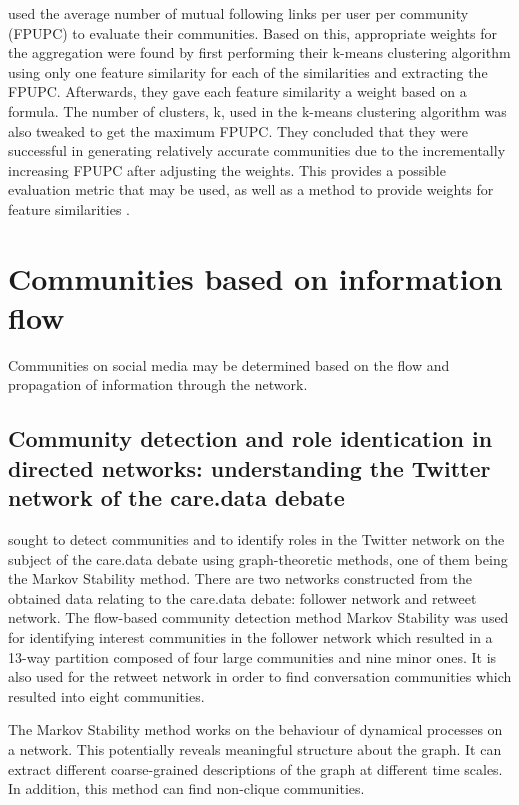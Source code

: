  used the average number of mutual following links per user per community (FPUPC) to evaluate their communities. Based on this, appropriate weights for the aggregation were found by first performing their k-means clustering algorithm using only one feature similarity for each of the similarities and extracting the FPUPC. Afterwards, they gave each feature similarity a weight based on a formula. The number of clusters, k, used in the k-means clustering algorithm was also tweaked to get the maximum FPUPC. They concluded that they were successful in generating relatively accurate communities due to the incrementally increasing FPUPC after adjusting the weights. This provides a possible evaluation metric that may be used, as well as a method to provide weights for feature similarities \cite{Zhang:2012}.


\section{Communities based on information flow}


Communities on social media may be determined based on the flow and propagation of information through the network.


\subsection{Community detection and role identication in directed networks: understanding the Twitter network of the care.data debate}


 sought to detect communities and to identify roles in the Twitter network on the subject of the care.data debate using graph-theoretic methods, one of them being the Markov Stability method. There are two networks constructed from the obtained data relating to the care.data debate: follower network and retweet network. The flow-based community detection method Markov Stability was used for identifying interest communities in the follower network which resulted in a 13-way partition composed of four large communities and nine minor ones. It is also used for the retweet network in order to find conversation communities which resulted into eight communities. 


The Markov Stability method works on the behaviour of dynamical processes on a network. This potentially reveals meaningful structure about the graph. It can extract different coarse-grained descriptions of the graph at different time scales. In addition, this method can find non-clique communities.



